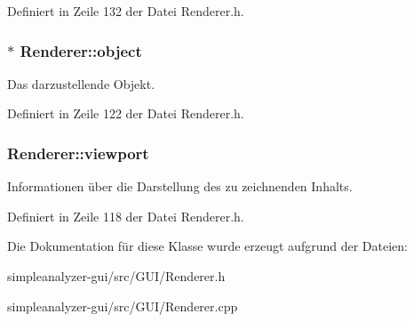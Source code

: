 Definiert in Zeile 132 der Datei Renderer.\-h.

\hypertarget{classRenderer_a4ad4a42fe6bfd32ff3ef4bb1d59f8f96}{
\subsubsection[{object}]{$\ast$ Renderer\-::object\hspace{0.3cm}{\ttfamily [private]}}}\label{classRenderer_a4ad4a42fe6bfd32ff3ef4bb1d59f8f96}
Das darzustellende Objekt. 

Definiert in Zeile 122 der Datei Renderer.\-h.

\hypertarget{classRenderer_a4428a5ef0ceaf4de5c9991a40990994d}{
\subsubsection[{viewport}]{ Renderer\-::viewport\hspace{0.3cm}{\ttfamily [private]}}}\label{classRenderer_a4428a5ef0ceaf4de5c9991a40990994d}
Informationen über die Darstellung des zu zeichnenden Inhalts. 

Definiert in Zeile 118 der Datei Renderer.\-h.



Die Dokumentation für diese Klasse wurde erzeugt aufgrund der Dateien\-:\begin{DoxyCompactItemize}
\item 
simpleanalyzer-\/gui/src/\-G\-U\-I/Renderer.\-h\item 
simpleanalyzer-\/gui/src/\-G\-U\-I/Renderer.\-cpp\end{DoxyCompactItemize}
